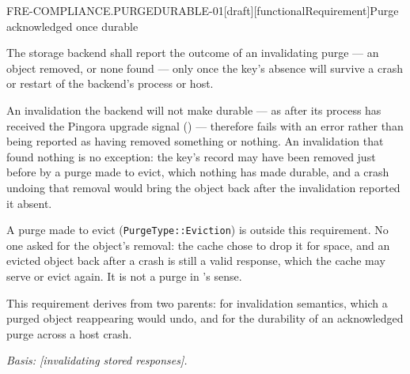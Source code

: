 \begin{requirement}{FRE-COMPLIANCE.PURGEDURABLE-01}[draft][functionalRequirement]{Purge acknowledged once durable}


  The storage backend shall report the outcome of an invalidating purge ---
  an object removed, or none found --- only once the key's absence will
  survive a crash or restart of the backend's process or host.

  An invalidation the backend will not make durable --- as after its process
  has received the Pingora upgrade signal ()
  --- therefore fails with an error rather than being reported as having
  removed something or nothing. An invalidation that found nothing is no
  exception: the key's record may have been removed just before by a purge
  made to evict, which nothing has made durable, and a crash undoing that
  removal would bring the object back after the invalidation reported it
  absent.

  A purge made to evict (\texttt{PurgeType::Eviction}) is outside this
  requirement. No one asked for the object's removal: the cache chose to
  drop it for space, and an evicted object back after a crash is still a
  valid response, which the cache may serve or evict again. It is not a
  purge in 's sense.

  This requirement derives from two parents: 
  for invalidation semantics, which a purged object reappearing would undo,
  and  for the durability of an
  acknowledged purge across a host crash.

  \textit{Basis: [invalidating stored responses].}



\end{requirement}

